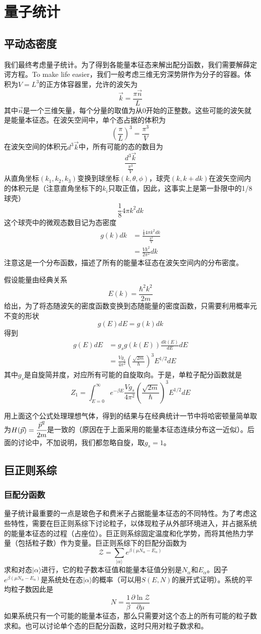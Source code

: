\documentclass[a4paper,11pt]{ctexart}
\newcommand{\beq}{\begin{equation}}
\newcommand{\eeq}{\end{equation}}
\newcommand{\bea}{\begin{equation}\begin{aligned}}
\newcommand{\eea}{\end{aligned}\end{equation}}
\newcommand{\red}{\color{red}}
\newcommand{\grandz}{\mathcal{Z}}
\begin{document}
\section{量子统计}
\subsection{平动态密度}
我们最终考虑量子统计。为了得到各能量本征态来解出配分函数，我们需要解薛定谔方程。To make life easier，我们一般考虑三维无穷深势阱作为分子的容器。体积为$V = L^3$的正方体容器里，允许的波矢为
\beq
\vec{k} = \frac{\pi \vec{n}}{L}
\eeq
其中$\vec{n}$是一个三维矢量，每个分量的取值为从0开始的正整数。这些可能的波矢就是能量本征态。在波矢空间中，单个态占据的体积为
\beq
\left(\frac{\pi}{L}\right)^3 = \frac{\pi^3}{V}
\eeq
在波矢空间的体积元$d^3\vec{k}$中，所有可能的态的数目为
\beq
\frac{d^3\vec{k}}{\frac{\pi^3}{V}}
\eeq
从直角坐标$(k_1,k_2,k_3)$变换到球坐标$(k,\theta,\phi)$，球壳$(k,k+dk)$在波矢空间内的体积元是（注意直角坐标下的$k_i$只取正值，因此，这事实上是第一卦限中的1/8球壳）
\beq
\frac{1}{8} 4\pi k^2 dk
\eeq
这个球壳中的微观态数目记为{\red 态密度}
\bea
g(k)dk &= \frac{\frac{1}{8} 4\pi k^2 dk}{\frac{\pi^3}{V}} \\
&= \frac{Vk^2}{2\pi^2}dk
\eea
注意这是一个分布函数，描述了所有的能量本征态在波矢空间内的分布密度。
\par
假设能量由经典关系
\beq
E(k) = \frac{\hbar^2 k^2}{2m}
\eeq
给出，为了将态随波矢的密度函数变换到态随能量的密度函数，只需要利用概率元不变的形状
\beq
g(E)dE = g(k) dk
\eeq
得到
\bea
g(E)dE &= g_s g(k(E)) \frac{dk(E)}{dE} dE \\
&= \frac{Vg_s}{4\pi^2} \left(\frac{\sqrt{2m}}{\hbar}\right)^3 E^{1/2} dE
\eea
其中$g_s$是自旋简并度，对应所有可能的自旋取向。于是，单粒子配分函数就是
\beq
Z_1 = \int_{E=0}^\infty e^{-\beta E}\frac{Vg_s}{4\pi^2} \left(\frac{\sqrt{2m}}{\hbar}\right)^3 E^{1/2} dE
\eeq
\par
用上面这个公式处理理想气体，得到的结果与在经典统计一节中将哈密顿量简单取为$H(\vec{p})= \cfrac{\vec{p}^2}{2m}$是一致的（原因在于上面采用的能量本征态连续分布这一近似）。后面的讨论中，不加说明，我们都忽略自旋，取$g_s = 1$。
\subsection{巨正则系综}
\subsubsection{巨配分函数}
量子统计最重要的一点是玻色子和费米子占据能量本征态的不同特性。为了考虑这些特性，需要在巨正则系综下讨论粒子，以体现粒子从外部环境进入，并占据系统的能量本征态的过程（占座位）。巨正则系综固定温度和化学势，而将其他热力学量（包括粒子数）作为变量。巨正则系综下的巨配分函数为
\beq
\grandz = \sum_{|\alpha \rangle}e^{\beta(\mu N_\alpha - E_\alpha)}
\eeq
求和对态$|\alpha \rangle$进行，它的粒子数本征值和能量本征值分别是$N_\alpha$和$E_\alpha$。因子$e^{\beta(\mu N_\alpha - E_\alpha)}$是系统处在态$|\alpha \rangle$的概率（可以用$S(E,N)$的展开式证明）。系统的平均粒子数因此是
\beq
N = \frac{1}{\beta} \frac{\partial \ln \grandz}{\partial \mu}
\eeq
如果系统只有一个可能的能量本征态，那么只需要对这个态上的所有可能的粒子数求和。也可以讨论单个态的巨配分函数，这时只用对粒子数求和。
\end{document}
